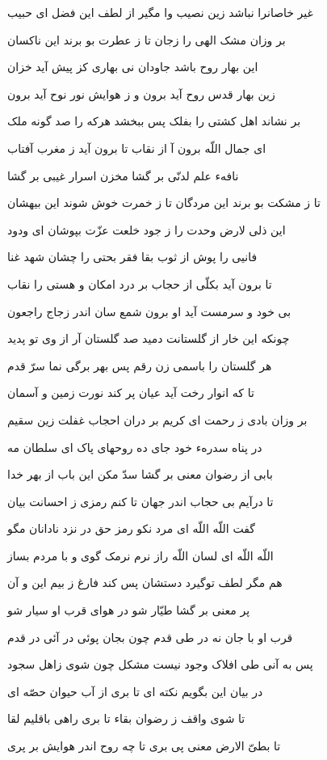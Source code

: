 غير خاصانرا نباشد زين نصيب
وا مگير از لطف اين فضل اى حبيب

بر وزان مشک الهى را زجان
تا ز عطرت بو برند اين ناکسان

اين بهار روح باشد جاودان
نى بهارى کز پيش آيد خزان

زين بهار قدس روح آيد برون
و ز هوايش نور نوح آيد برون

بر نشاند اهل کشتى را بفلک
پس ببخشد هرکه را صد گونه ملک

اى جمال اللّه برون آ از نقاب
تا برون آيد ز مغرب آفتاب

نافهء علم لدنّى بر گشا
مخزن اسرار غيبى بر گشا

تا ز مشکت بو برند اين مردگان
تا ز خمرت خوش شوند اين بيهشان

اين ذلی لارض وحدت را ز جود
خلعت عزّت بپوشان اى ودود

فانيى را پوش از ثوب بقا
فقر بحتى را چشان شهد غنا

تا برون آيد بکلّى از حجاب
بر درد امکان و هستى را نقاب

بى خود و سرمست آيد او برون
شمع سان اندر زجاج راجعون

چونکه اين خار از گلستانت دميد
صد گلستان آر از وى تو پديد

هر گلستان را باسمى زن رقم
پس بهر برگى نما سر‌ّ قدم

تا که انوار رخت آيد عيان
پر کند نورت زمين و آسمان

بر وزان بادى ز رحمت اى کريم
بر دران احجاب غفلت زين سقيم

در پناه سدرهء خود جاى ده
روحهاى پاک اى سلطان مه

بابى از رضوان معنى بر گشا
سدّ مکن اين باب از بهر خدا

تا درآيم بى حجاب اندر جهان
تا کنم رمزى ز احسانت بيان

گفت اللّه اللّه اى مرد نکو
رمز حق در نزد نادانان مگو

اللّه اللّه اى لسان اللّه راز
نرم نرمک گوى و با مردم بساز

هم مگر لطف توگيرد دستشان
پس کند فارغ ز بيم اين و آن

پر معنى بر گشا طيّار شو
در هواى قرب او سيار شو

قرب او با جان نه در طى قدم
چون بجان پوئى در آئى در قدم

پس به آنى طى افلاک وجود
نيست مشکل چون شوى زاهل سجود

در بيان اين بگويم نکته اى
تا برى از آب حيوان حصّه اى

تا شوى واقف ز رضوان بقاء
تا برى راهى باقليم لقا

تا بطىّ الارض معنى پى برى
تا چه روح اندر هوايش بر پرى

